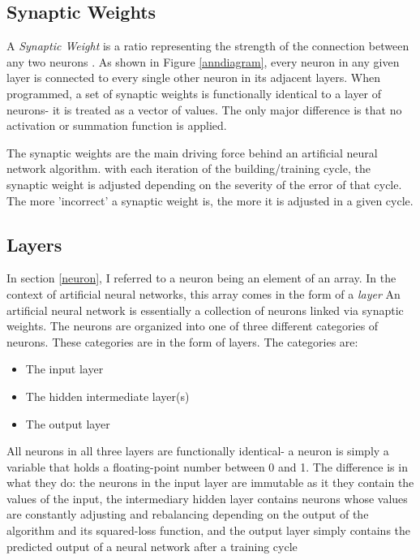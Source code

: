 \documentclass[12pt]{article}
\begin{document}
    \subsection{Synaptic Weights \label{weights}}
        
        A \textit{Synaptic Weight} is a ratio representing the strength of the connection between any two neurons \textcite{shamdasani2017}. As shown in Figure \ref{anndiagram}, every neuron in any given layer is connected to every single other neuron in its adjacent layers. When programmed, a set of synaptic weights is functionally identical to a layer of neurons- it is treated as a vector of values. The only major difference is that no activation or summation function is applied.

        The synaptic weights are the main driving force behind an artificial neural network algorithm. with each iteration of the building/training cycle, the synaptic weight is adjusted depending on the severity of the error of that cycle. The more 'incorrect' a synaptic weight is, the more it is adjusted in a given cycle. 

    \subsection{Layers}

        In section \ref{neuron}, I referred to a neuron being an element of an array. In the context of artificial neural networks, this array comes in the form of a \textit{layer} An artificial neural network is essentially a collection of neurons linked via synaptic weights. The neurons are organized into one of three different categories of neurons. These categories are in the form of layers. The categories are:

        \begin{itemize}
            \item The input layer
            \item The hidden intermediate layer(s)
            \item The output layer
        \end{itemize}
        
        All neurons in all three layers are functionally identical- a neuron is simply a variable that holds a floating-point number between 0 and 1. The difference is in what they do: the neurons in the input layer are immutable as it they contain the values of the input, the intermediary hidden layer contains neurons whose values are constantly adjusting and rebalancing depending on the output of the algorithm and its squared-loss function, and the output layer simply contains the predicted output of a neural network after a training cycle
\end{document}
